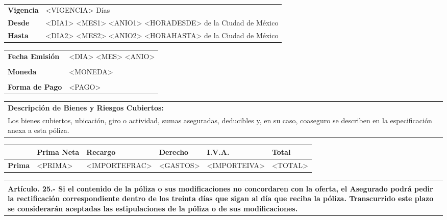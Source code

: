 \documentclass[letterpaper,10pt]{article}
\begin{document}
\hspace{1cm}\\
\begin{tabularx}{0.5\textwidth}{|l|X|}
    \hline
    \textbf{Vigencia} & <VIGENCIA> Días\\
    \textbf{Desde} & <DIA1> <MES1> <ANIO1> <HORADESDE> de la Ciudad de México\\
    \textbf{Hasta} & <DIA2> <MES2> <ANIO2> <HORAHASTA> de la Ciudad de México\\
    \hline
\end{tabularx}
\begin{tabularx}{0.5\textwidth}{|l|X|}
    \hline
    \textbf{Fecha Emisión} & <DIA> <MES> <ANIO>\\
    &\\
    \textbf{Moneda} & <MONEDA>\\
    &\\
    \textbf{Forma de Pago} & <PAGO>\\
    \hline
\end{tabularx}

\begin{center}
    \begin{tabularx}{\textwidth}{|X|}
        \hline
        \textbf{Descripción de Bienes y Riesgos Cubiertos:}\\
        Los bienes cubiertos, ubicación, giro o actividad, sumas aseguradas, deducibles y, en su caso, coaseguro se describen en la especificación anexa a esta póliza.\\
        \hline
    \end{tabularx}
\end{center}

\begin{center}
    \begin{tabularx}{\textwidth}{|l|Y|Y|Y|Y|Y|}
        \hline
          & \textbf{Prima Neta} & \textbf{Recargo} & \textbf{Derecho} & \textbf{I.V.A.} &\textbf{Total}\\\hline
        \textbf{Prima} & <PRIMA> & <IMPORTEFRAC> & <GASTOS> & <IMPORTEIVA> & <TOTAL>\\
        \hline
    \end{tabularx}
\end{center}

\begin{center}
    \begin{tabularx}{\textwidth}{|X|}
        \hline
        \textbf{}\\
        \textbf{Artículo. 25.- Si el contenido de la póliza o sus modificaciones no concordaren con la oferta, el Asegurado podrá pedir la rectificación correspondiente dentro de los treinta días que sigan al día que reciba la póliza. Transcurrido este plazo se considerarán aceptadas las estipulaciones de la póliza o de sus modificaciones.}\\
        \hline
    \end{tabularx}
\end{center}
\end{document}
